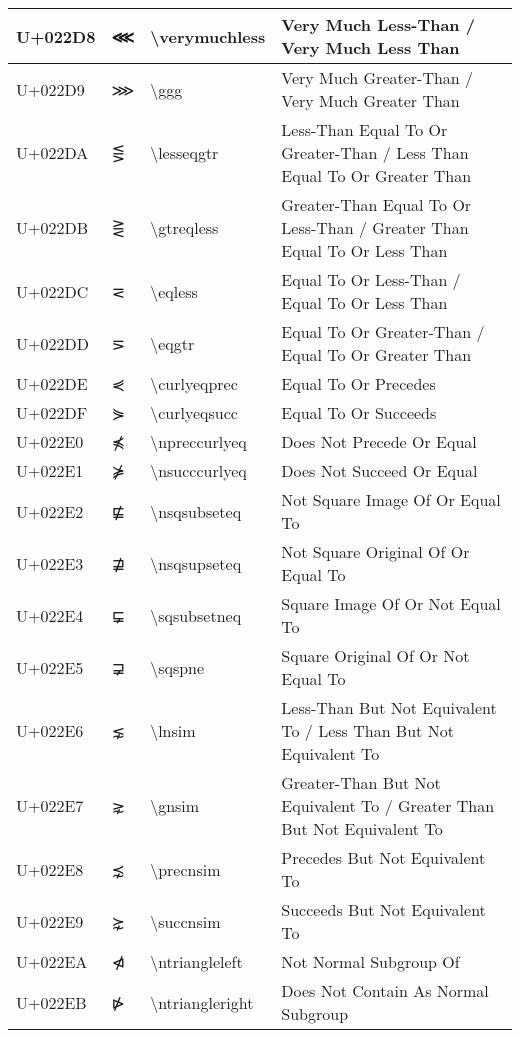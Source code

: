 \begin{table}[h]
\begin{tabulary}{\linewidth}{|L|L|L|L|}
\hline
U+022D8 & ⋘ & {\textbackslash}verymuchless & Very Much Less-Than / Very Much Less Than \\
\hline
U+022D9 & ⋙ & {\textbackslash}ggg & Very Much Greater-Than / Very Much Greater Than \\
\hline
U+022DA & ⋚ & {\textbackslash}lesseqgtr & Less-Than Equal To Or Greater-Than / Less Than Equal To Or Greater Than \\
\hline
U+022DB & ⋛ & {\textbackslash}gtreqless & Greater-Than Equal To Or Less-Than / Greater Than Equal To Or Less Than \\
\hline
U+022DC & ⋜ & {\textbackslash}eqless & Equal To Or Less-Than / Equal To Or Less Than \\
\hline
U+022DD & ⋝ & {\textbackslash}eqgtr & Equal To Or Greater-Than / Equal To Or Greater Than \\
\hline
U+022DE & ⋞ & {\textbackslash}curlyeqprec & Equal To Or Precedes \\
\hline
U+022DF & ⋟ & {\textbackslash}curlyeqsucc & Equal To Or Succeeds \\
\hline
U+022E0 & ⋠ & {\textbackslash}npreccurlyeq & Does Not Precede Or Equal \\
\hline
U+022E1 & ⋡ & {\textbackslash}nsucccurlyeq & Does Not Succeed Or Equal \\
\hline
U+022E2 & ⋢ & {\textbackslash}nsqsubseteq & Not Square Image Of Or Equal To \\
\hline
U+022E3 & ⋣ & {\textbackslash}nsqsupseteq & Not Square Original Of Or Equal To \\
\hline
U+022E4 & ⋤ & {\textbackslash}sqsubsetneq & Square Image Of Or Not Equal To \\
\hline
U+022E5 & ⋥ & {\textbackslash}sqspne & Square Original Of Or Not Equal To \\
\hline
U+022E6 & ⋦ & {\textbackslash}lnsim & Less-Than But Not Equivalent To / Less Than But Not Equivalent To \\
\hline
U+022E7 & ⋧ & {\textbackslash}gnsim & Greater-Than But Not Equivalent To / Greater Than But Not Equivalent To \\
\hline
U+022E8 & ⋨ & {\textbackslash}precnsim & Precedes But Not Equivalent To \\
\hline
U+022E9 & ⋩ & {\textbackslash}succnsim & Succeeds But Not Equivalent To \\
\hline
U+022EA & ⋪ & {\textbackslash}ntriangleleft & Not Normal Subgroup Of \\
\hline
U+022EB & ⋫ & {\textbackslash}ntriangleright & Does Not Contain As Normal Subgroup \\

\end{tabulary}
\end{table}
